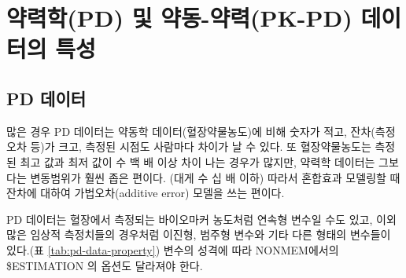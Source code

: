 \documentclass[
  11pt,
  krantz2,
  a4paper]{krantz}
\theoremstyle{definition}
\theoremstyle{definition}
\theoremstyle{definition}
\theoremstyle{remark}
\begin{document}
\hypertarget{uxc57duxb825uxd559pd-uxbc0f-uxc57duxb3d9-uxc57duxb825pk-pd-uxb370uxc774uxd130uxc758-uxd2b9uxc131}{%
\section{약력학(PD) 및 약동-약력(PK-PD) 데이터의 특성}\label{uxc57duxb825uxd559pd-uxbc0f-uxc57duxb3d9-uxc57duxb825pk-pd-uxb370uxc774uxd130uxc758-uxd2b9uxc131}}

\hypertarget{pd-uxb370uxc774uxd130}{%
\subsection{PD 데이터}\label{pd-uxb370uxc774uxd130}}

많은 경우 PD 데이터는 약동학 데이터(혈장약물농도)에 비해 숫자가 적고, 잔차(측정오차 등)가 크고, 측정된 시점도 사람마다 차이가 날 수 있다. 또 혈장약물농도는 측정된 최고 값과 최저 값이 수 백 배 이상 차이 나는 경우가 많지만, 약력학 데이터는 그보다는 변동범위가 훨씬 좁은 편이다. (대게 수 십 배 이하) 따라서 혼합효과 모델링할 때 잔차에 대하여 가법오차(additive error) 모델을 쓰는 편이다.

PD 데이터는 혈장에서 측정되는 바이오마커 농도처럼 연속형 변수일 수도 있고, 이외 많은 임상적 측정치들의 경우처럼 이진형, 범주형 변수와 기타 다른 형태의 변수들이 있다.(표 \ref{tab:pd-data-property}) 변수의 성격에 따라 NONMEM에서의 \$ESTIMATION 의 옵션도 달라져야 한다.

\end{document}
